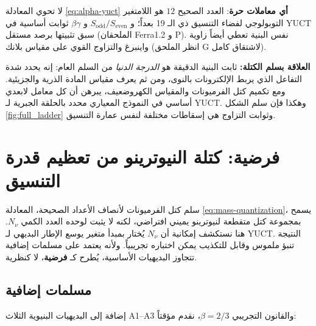 \documentclass[12pt,a4paper]{article}
\begin{document}
	لا تحوي المعادلة \eqref{eq:alpha-yuct} \textbf{أي معاملات حرة}: العدد الصحيح \(12\) هو اللامتغير التوبولوجي لفضاء التنسيق ذي الـ 19 بعداً؛ و \(S_{\mathrm{odd}}/S_{\mathrm{even}}\) و \(\beta\gamma\) ثوابت أساسية في YUCT سبق تثبيتها برصد مستقل (الملحقان Ferra1.2 و P). نفس البنية تعطي أيضاً زاوية واينبرغ والتزاوج القوي على مقياس بلانك (انظر الملحق G لاشتقاق كامل).
	
	\textbf{العلاقة بسلم الكتلة:} ثابت البنية الدقيقة هو \emph{الدرجة الدنيا} من السلم العام: إنه يحدد شدة التفاعل الذي يربط الإلكترونات بالنوى، ومن ثم يعرف مقياس المادة الذرية والجزيئية. ومع تكميم كتل الفرميونات والمقياس الكهروضعيف، يبرهن أن كل معامل لابعدي أساسي في النموذج المعياري محدد بالحلقة الجبرية لـ YUCT. وهكذا فإن سلم الشكل \ref{fig:full_ladder} وثوابت التزاوج هي إسقاطات مختلفة لنفس عمارة التنسيق.
	
	\section{فرضية: كتلة النيوترينو من تعظيم قدرة التنسيق}
	\label{sec:neutrino-hypothesis}
	
	سلم كتل الفرميونات لأنصاف الأعداد الصحيحة، المعادلة \eqref{eq:mass-quantization}، يسمح بمجموعة كتل متقطعة لنيوترينو يميني افتراضي، لكنه لا يثبت لوحده العدد الكمي \(N_{\nu}\). هنا نستكشف إمكانية أن \(N_{\nu}\) يُختار بمبدأ متغير يوسع الإطار البديهي لـ YUCT. النتيجة تنبؤ ملموس وقابل للتكذيب يمكن اختباره تجريبياً. ولأنه يعتمد على مسلمات إضافية تتجاوز البديهيات الأساسية، يُطرح كـ \textbf{فرضية}، لا كنظرية.
	
	\subsection{مسلمات إضافية}
	
	إضافة إلى البديهيات البنيوية الثلاث A1--A3 والقانون التجريبي \(\beta=2/3\)، نقدم مؤقتاً:
	
\end{document}
